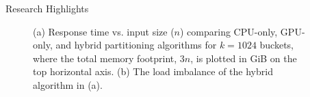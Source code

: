 \documentclass[final]{beamer}
\newlength{\sepwidth}
\newlength{\colwidth}
\newcommand{\separatorcolumn}{\begin{column}{\sepwidth}\end{column}}
\begin{document}
\begin{frame}[t]
\begin{columns}[t]
\begin{column}{\colwidth}
\begin{block}{Research Highlights}
 
   
   \begin{figure}[htp]
\centering
{}
\caption{(a) Response time vs. input size ($n$) comparing CPU-only, GPU-only, and hybrid partitioning algorithms for $k=1024$ buckets, where the total memory footprint, $3n$, is plotted in GiB on the top horizontal axis. (b) The load imbalance of the hybrid algorithm in (a).}
   \label{fig:partitioning-results}
\end{figure}

\end{block} 

\end{column}

\separatorcolumn
\end{columns}
\end{frame}
\end{document}
